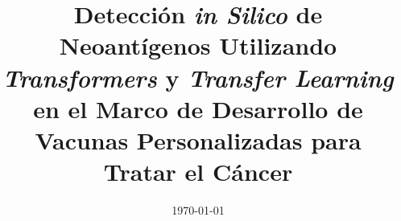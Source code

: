 \documentclass[a4paper, 11pt, oneside]{Thesis}  %
\begin{document}
	
	
\frontmatter      %



\title  {Detección \textit{in Silico} de Neoantígenos Utilizando \textit{Transformers} y \textit{Transfer Learning} en el Marco de Desarrollo de Vacunas Personalizadas para Tratar el Cáncer}
\addresses  {\groupname\\\deptname\\\univname}  %
\date       {\today}
\subject    {}
\keywords   {}

\maketitle


\fancyhead{}  %
\rhead{\thepage}  %
\lhead{}  %





\pagestyle{fancy}  %
\end{document}
